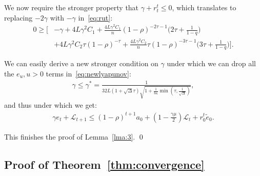 \documentclass[twoside]{article}
\newcommand{\stepsize}{\gamma}
\newcommand{\strongconvex}{\mu}
\newcommand{\overlap}{\tau}
\newcommand{\contraction}{\rho}
\newcommand{\sparsity}{\Delta}
\newcommand{\lipschitz}{L}
\newcommand{\lyapunov}{\mathcal{L}}
\begin{document}
We now require the stronger property that $\stepsize +r_t^t \leq 0$, which translates to replacing $-2\stepsize$ with $-\stepsize$ in~\eqref{eq:rut}:
\begin{equation}
\begin{aligned}
0 \geq 
	\Big[
		&- \stepsize
		+4\lipschitz\stepsize^2 C_1
		+\frac{4\lipschitz\stepsize^2 C_1}{n}
			(1 - \contraction)^{-2\overlap - 1} \big(
				2\overlap
				+\frac{1}{1-q}
			\big) 
\\
		&+4\lipschitz\stepsize^2  C_2 \overlap(1-\contraction)^{-\overlap}
		+\frac{4\lipschitz\stepsize^2  C_2}{n} \overlap (1 -\contraction)^{-3\overlap-1}
			\big(
				3\overlap
				+ \frac{1}{1-q}
		\big)
	\Big] .
\end{aligned}
\end{equation}

We can easily derive a new stronger condition on $\stepsize$ under which we can drop all the $e_u, u > 0$ terms in~\eqref{eq:newlyapunov}:
\begin{align}
\stepsize \leq \stepsize^* = \frac{1}{32\lipschitz (1 + \sqrt{\sparsity} \overlap) \sqrt{1 + \frac{1}{8\kappa} \min(\overlap, \frac{1}{\sqrt{\sparsity}})}},
\end{align}
and thus under which we get:
\begin{align}\label{eq:lyapu3}
\stepsize  e_t + \lyapunov_{t+1} \leq (1 - \contraction)^{t+1}a_0 + (1-\frac{\stepsize\strongconvex}{2})\lyapunov_t + r_0^t \tilde e_0 .
\end{align}

This finishes the proof of Lemma~\ref{lma:3}. 
\qed

\subsection{Proof of Theorem~\ref{thm:convergence}}\label{apxB:th2}
\end{document}
